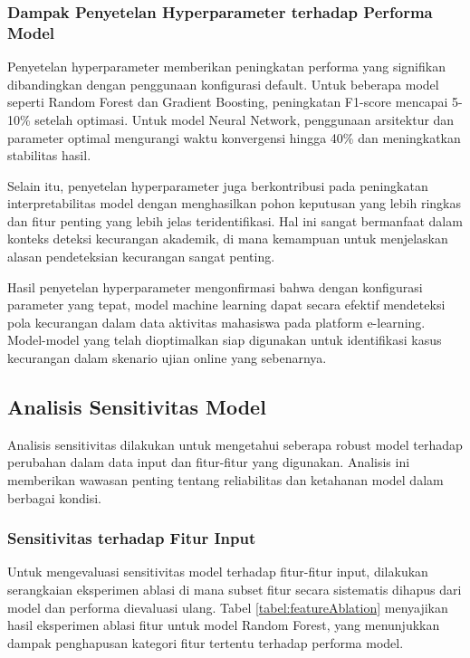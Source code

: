 \subsubsection{Dampak Penyetelan Hyperparameter terhadap Performa Model}

Penyetelan hyperparameter memberikan peningkatan performa yang signifikan dibandingkan dengan penggunaan konfigurasi default. Untuk beberapa model seperti Random Forest dan Gradient Boosting, peningkatan F1-score mencapai 5-10\% setelah optimasi. Untuk model Neural Network, penggunaan arsitektur dan parameter optimal mengurangi waktu konvergensi hingga 40\% dan meningkatkan stabilitas hasil.

Selain itu, penyetelan hyperparameter juga berkontribusi pada peningkatan interpretabilitas model dengan menghasilkan pohon keputusan yang lebih ringkas dan fitur penting yang lebih jelas teridentifikasi. Hal ini sangat bermanfaat dalam konteks deteksi kecurangan akademik, di mana kemampuan untuk menjelaskan alasan pendeteksian kecurangan sangat penting.

Hasil penyetelan hyperparameter mengonfirmasi bahwa dengan konfigurasi parameter yang tepat, model machine learning dapat secara efektif mendeteksi pola kecurangan dalam data aktivitas mahasiswa pada platform e-learning. Model-model yang telah dioptimalkan siap digunakan untuk identifikasi kasus kecurangan dalam skenario ujian online yang sebenarnya.

\subsection{Analisis Sensitivitas Model}
\label{subsec:analisisSensitivitasModel}

Analisis sensitivitas dilakukan untuk mengetahui seberapa robust model terhadap perubahan dalam data input dan fitur-fitur yang digunakan. Analisis ini memberikan wawasan penting tentang reliabilitas dan ketahanan model dalam berbagai kondisi.

\subsubsection{Sensitivitas terhadap Fitur Input}

Untuk mengevaluasi sensitivitas model terhadap fitur-fitur input, dilakukan serangkaian eksperimen ablasi di mana subset fitur secara sistematis dihapus dari model dan performa dievaluasi ulang. Tabel \ref{tabel:featureAblation} menyajikan hasil eksperimen ablasi fitur untuk model Random Forest, yang menunjukkan dampak penghapusan kategori fitur tertentu terhadap performa model.

